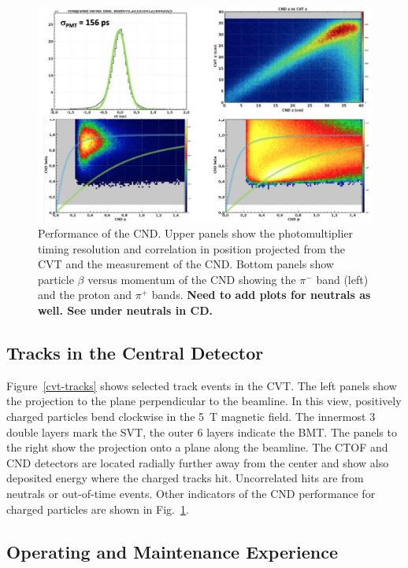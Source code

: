 \documentclass[final,3p,twocolumn]{elsarticle}
\begin{document}
\begin{figure}[htbp!]
\centerline{\includegraphics[width=1.0\columnwidth]{cnd-performance.png}}
\caption{Performance of the CND. Upper panels show the photomultiplier timing resolution and correlation in position
projected from the CVT and the measurement of the CND. Bottom panels show particle $\beta$ versus momentum
of the CND showing the $\pi^-$ band (left) and the proton and $\pi^+$ bands. {\bf Need to add plots for neutrals
as well. See under neutrals in CD.}}
\label{cnd-performance}
\end{figure}

\subsection{Tracks in the Central Detector}

Figure~\ref{cvt-tracks} shows selected track events in the CVT. The left panels show the projection to the plane
perpendicular to the beamline. In this view, positively charged particles bend clockwise in the 5~T magnetic field.
The innermost 3 double layers mark the SVT, the outer 6 layers indicate the BMT. The panels to the right show the
projection onto a plane along the beamline. The CTOF and CND detectors are located radially further away from
the center and show also deposited energy where the charged tracks hit. Uncorrelated hits are from neutrals or
out-of-time events. Other indicators of the CND performance for charged particles are shown in
Fig.~\ref{cnd-performance}.  

\subsection{Operating and Maintenance Experience}
\end{document}
